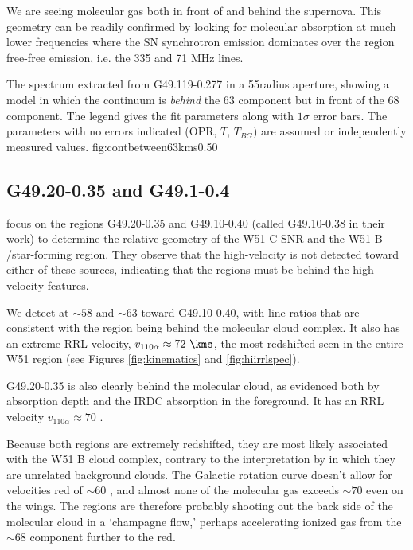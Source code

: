 We are seeing molecular gas both in front of and behind the supernova.  This
geometry can be readily confirmed by looking for molecular absorption at much
lower frequencies where the SN synchrotron emission dominates over the \hii
region free-free emission, i.e. the 335 and 71 MHz \para lines.

{The spectrum extracted from G49.119-0.277 in a 55\arcsec radius aperture,
showing a model in which the continuum is \emph{behind} the 63 \kms component
but in front of the 68 \kms component.  The legend gives the fit parameters
along with $1\sigma$ error bars.  The parameters with no errors indicated
(OPR, $T$, $T_{BG}$) are assumed or independently measured values.}
{fig:contbetween63kms}{0.5}{0}

\subsection{G49.20-0.35 and G49.1-0.4}
\citet{Tian2013a} focus on the \hii regions G49.20-0.35 and G49.10-0.40 (called
G49.10-0.38 in their work) to determine the relative geometry
of the W51 C SNR and the W51 B \hii/star-forming region.  They observe that the
high-velocity \hi is not detected toward either of these sources, indicating
that the \hii regions must be behind the high-velocity \hi features.

We detect \formaldehyde \oneone at $\sim58$ and $\sim63$ \kms toward
G49.10-0.40, with line ratios that are consistent with the \hii region being
behind the molecular cloud complex.  It also has an extreme RRL velocity,
$v_{110\alpha} \approx 72~\kms$, the most redshifted seen in the entire W51 region
(see Figures \ref{fig:kinematics} and \ref{fig:hiirrlspec}).

G49.20-0.35 is also clearly behind the molecular cloud, as evidenced both by
\formaldehyde absorption depth and the IRDC absorption in the foreground.
It has an RRL velocity $v_{110\alpha} \approx 70$ \kms.

Because both \hii regions are extremely redshifted, they are most likely
associated with the W51 B cloud complex, contrary to the interpretation by
\citet{Tian2013a} in which they are unrelated background clouds.  The Galactic
rotation curve doesn't allow for velocities red of $\sim60$ \kms, and almost
none of the molecular gas exceeds $\sim70$ \kms even on the wings.  The \hii
regions are therefore probably shooting out the back side of the molecular
cloud in a `champagne flow,' perhaps accelerating ionized gas from the $\sim
68$ \kms component
further to the red.

